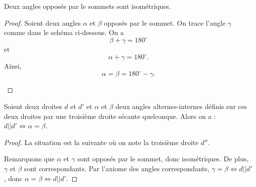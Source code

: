 \documentclass[a4paper,12pt]{report}
\begin{document}
\begin{thm}
	Deux angles opposés par le sommets sont isométriques.
\end{thm}
\begin{proof}
	Soient deux angles $\alpha$ et $\beta$ opposés par le sommet. On trace l'angle $\gamma$ comme dans le schéma ci-dessous. On a 
	\[\beta+\gamma=180^\circ\]
	et 
	\[\alpha+\gamma=180^\circ.\]
	Ainsi, 
	\[\alpha=\beta=180^\circ-\gamma.\]
\begin{center}
\end{center}
\end{proof}
\begin{thm}
	Soient deux droites $d$ et $d'$ et $\alpha$ et $\beta$ deux angles alternes-internes définis sur ces deux droites par une troisième droite sécante quelconque. Alors on a : $d||d '\iff \alpha = \beta$.
\end{thm}
\begin{proof}
La situation est la suivante où on note la troisième droite $d''$. 

\begin{center}
\end{center}

Remarquons que $\alpha$ et $\gamma$ sont opposés par le sommet, donc isométriques. De plus, $\gamma$ et $\beta$ sont correspondants. Par l'axiome des angles correspondants, $\gamma=\beta \iff d||d'$, donc $\alpha=\beta \iff d|| d'$. 


\end{proof}
\newpage
\end{document}
